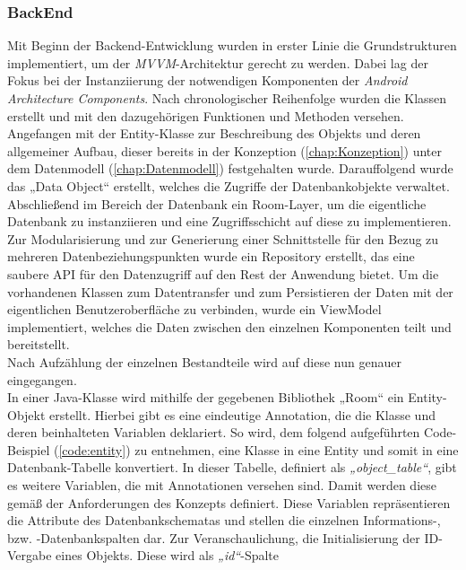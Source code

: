\subsubsection{BackEnd}
Mit Beginn der Backend-Entwicklung wurden in erster Linie die Grundstrukturen implementiert, um der \textit{MVVM}-Architektur gerecht zu werden. Dabei lag 
der Fokus bei der Instanziierung der notwendigen Komponenten der \textit{Android Architecture Components}. Nach chronologischer Reihenfolge wurden die Klassen 
erstellt und mit den dazugehörigen Funktionen und Methoden versehen. Angefangen mit der Entity-Klasse zur Beschreibung des Objekts und deren allgemeiner Aufbau, 
dieser bereits in der Konzeption (\ref{chap:Konzeption}) unter dem Datenmodell (\ref{chap:Datenmodell}) festgehalten wurde. Darauffolgend wurde das „Data Object“ 
erstellt, welches die Zugriffe der Datenbankobjekte verwaltet. Abschließend im Bereich der Datenbank ein Room-Layer, um die eigentliche Datenbank zu 
instanziieren und eine Zugriffsschicht auf diese zu implementieren. 
\\ 
Zur Modularisierung und zur Generierung einer Schnittstelle für den Bezug zu mehreren Datenbeziehungspunkten wurde ein Repository erstellt, das eine saubere 
\acs{API} für den Datenzugriff auf den Rest der Anwendung bietet. Um die vorhandenen Klassen zum Datentransfer und zum Persistieren der Daten mit der 
eigentlichen Benutzeroberfläche zu verbinden, wurde ein ViewModel implementiert, welches die Daten zwischen den einzelnen Komponenten teilt und bereitstellt. 
\\ 
\linebreak 
Nach Aufzählung der einzelnen Bestandteile wird auf diese nun genauer eingegangen. 
\\ 
\linebreak
In einer Java-Klasse wird mithilfe der gegebenen Bibliothek „Room“ ein Entity-Objekt erstellt. Hierbei gibt es eine eindeutige Annotation, die die Klasse und 
deren beinhalteten Variablen deklariert. So wird, dem folgend aufgeführten Code-Beispiel (\ref{code:entity}) zu entnehmen, eine Klasse in eine Entity und somit 
in eine Datenbank-Tabelle konvertiert. In dieser Tabelle, definiert als \textit{„object\_table“}, gibt es weitere Variablen, die mit Annotationen versehen sind. 
Damit werden diese gemäß der Anforderungen des Konzepts definiert. Diese Variablen repräsentieren die Attribute des Datenbankschematas und stellen die einzelnen 
Informations-, bzw. -Datenbankspalten dar. Zur Veranschaulichung, die Initialisierung der \acs{ID}-Vergabe eines Objekts. Diese wird als \textit{„id“}-Spalte 
